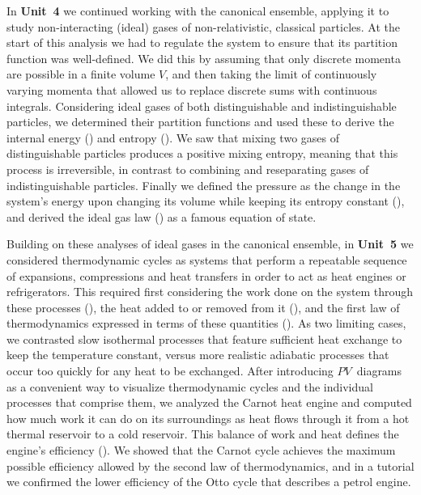 In \textbf{Unit~4} we continued working with the canonical ensemble, applying it to study non-interacting (ideal) gases of non-relativistic, classical particles.
At the start of this analysis we had to regulate the system to ensure that its partition function was well-defined.
We did this by assuming that only discrete momenta are possible in a finite volume $V$, and then taking the limit of continuously varying momenta that allowed us to replace discrete sums with continuous integrals.
Considering ideal gases of both distinguishable and indistinguishable particles, we determined their partition functions and used these to derive the internal energy () and entropy ().
We saw that mixing two gases of distinguishable particles produces a positive mixing entropy, meaning that this process is irreversible, in contrast to combining and reseparating gases of indistinguishable particles.
Finally we defined the pressure as the change in the system's energy upon changing its volume while keeping its entropy constant (), and derived the ideal gas law () as a famous equation of state.

Building on these analyses of ideal gases in the canonical ensemble, in \textbf{Unit~5} we considered thermodynamic cycles as systems that perform a repeatable sequence of expansions, compressions and heat transfers in order to act as heat engines or refrigerators.
This required first considering the work done on the system through these processes (), the heat added to or removed from it (), and the first law of thermodynamics expressed in terms of these quantities ().
As two limiting cases, we contrasted slow isothermal processes that feature sufficient heat exchange to keep the temperature constant, versus more realistic adiabatic processes that occur too quickly for any heat to be exchanged.
After introducing $PV$~diagrams as a convenient way to visualize thermodynamic cycles and the individual processes that comprise them, we analyzed the Carnot heat engine and computed how much work it can do on its surroundings as heat flows through it from a hot thermal reservoir to a cold reservoir.
This balance of work and heat defines the engine's efficiency ().
We showed that the Carnot cycle achieves the maximum possible efficiency allowed by the second law of thermodynamics, and in a tutorial we confirmed the lower efficiency of the Otto cycle that describes a petrol engine.

